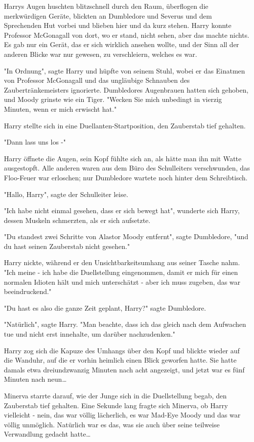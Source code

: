 {Harrys Augen huschten blitzschnell durch den Raum, überflogen die merkwürdigen Geräte, blickten an Dumbledore und Severus und dem Sprechenden Hut vorbei und blieben hier und da kurz stehen. Harry konnte Professor McGonagall von dort, wo er stand, nicht sehen, aber das machte nichts. Es gab nur ein Gerät, das er sich wirklich ansehen wollte, und der Sinn all der anderen Blicke war nur gewesen, zu verschleiern, welches es war.

"In Ordnung", sagte Harry und hüpfte von seinem Stuhl, wobei er das Einatmen von Professor McGonagall und das ungläubige Schnauben des Zaubertränkemeisters ignorierte. Dumbledores Augenbrauen hatten sich gehoben, und Moody grinste wie ein Tiger. "Wecken Sie mich unbedingt in vierzig Minuten, wenn er mich erwischt hat."

Harry stellte sich in eine Duellanten-Startposition, den Zauberstab tief gehalten.

"Dann lass uns los -"

Harry öffnete die Augen, sein Kopf fühlte sich an, als hätte man ihn mit Watte ausgestopft. Alle anderen waren aus dem Büro des Schulleiters verschwunden, das Floo-Feuer war erloschen; nur Dumbledore wartete noch hinter dem Schreibtisch.

"Hallo, Harry", sagte der Schulleiter leise.

"Ich habe nicht einmal gesehen, dass er sich bewegt hat", wunderte sich Harry, dessen Muskeln schmerzten, als er sich aufsetzte.

"Du standest zwei Schritte von Alastor Moody entfernt", sagte Dumbledore, "und du hast seinen Zauberstab nicht gesehen."

Harry nickte, während er den Unsichtbarkeitsumhang aus seiner Tasche nahm. "Ich meine - ich habe die Duellstellung eingenommen, damit er mich für einen normalen Idioten hält und mich unterschätzt - aber ich muss zugeben, das war beeindruckend."

"Du hast es also die ganze Zeit geplant, Harry?" sagte Dumbledore.

"Natürlich", sagte Harry. "Man beachte, dass ich das gleich nach dem Aufwachen tue und nicht erst innehalte, um darüber nachzudenken."

Harry zog sich die Kapuze des Umhangs über den Kopf und blickte wieder auf die Wanduhr, auf die er vorhin heimlich einen Blick geworfen hatte. Sie hatte damals etwa dreiundzwanzig Minuten nach acht angezeigt, und jetzt war es fünf Minuten nach neun…

Minerva starrte darauf, wie der Junge sich in die Duellstellung begab, den Zauberstab tief gehalten. Eine Sekunde lang fragte sich Minerva, ob Harry vielleicht - nein, das war völlig lächerlich, es war Mad-Eye Moody und das war völlig unmöglich. Natürlich war es das, was sie auch über seine teilweise Verwandlung gedacht hatte…

}
